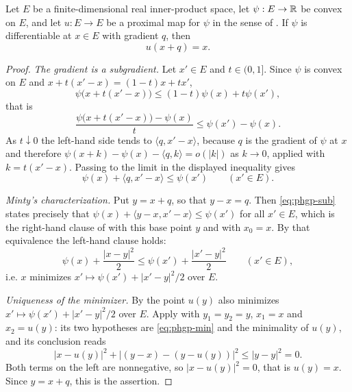 \begin{lemma}
Let $E$ be a finite-dimensional real inner-product space, let $\psi:E\to\mathbb{R}$ be
convex on $E$, and let $u:E\to E$ be a proximal map for $\psi$ in the sense of
. If $\psi$ is differentiable at $x\in E$ with gradient
$q$, then
\[
  u(x+q)=x .
\]
\end{lemma}
\begin{proof}
\emph{The gradient is a subgradient.}
Let $x'\in E$ and $t\in(0,1]$. Since $\psi$ is convex on $E$ and
$x+t(x'-x)=(1-t)x+tx'$,
\[
  \psi\bigl(x+t(x'-x)\bigr)\le(1-t)\psi(x)+t\psi(x'),
\]
that is
\[
  \frac{\psi\bigl(x+t(x'-x)\bigr)-\psi(x)}{t}\le\psi(x')-\psi(x).
\]
As $t\downarrow0$ the left-hand side tends to $\langle q,x'-x\rangle$, because
$q$ is the gradient of $\psi$ at $x$ and therefore
$\psi(x+k)-\psi(x)-\langle q,k\rangle=o(|k|)$ as $k\to0$, applied with
$k=t(x'-x)$. Passing to the limit in the displayed inequality gives
\begin{equation}\label{eq:phgp-sub}
  \psi(x)+\langle q,x'-x\rangle\le\psi(x')\qquad(x'\in E).
\end{equation}

\emph{Minty's characterization.}
Put $y=x+q$, so that $y-x=q$. Then \eqref{eq:phgp-sub} states precisely that
$\psi(x)+\langle y-x,x'-x\rangle\le\psi(x')$ for all $x'\in E$, which is the
right-hand clause of  with this base point $y$
and with $x_0=x$. By that equivalence the left-hand clause holds:
\begin{equation}\label{eq:phgp-min}
  \psi(x)+\frac{|x-y|^2}{2}\le\psi(x')+\frac{|x'-y|^2}{2}\qquad(x'\in E),
\end{equation}
i.e. $x$ minimizes $x'\mapsto\psi(x')+|x'-y|^2/2$ over $E$.

\emph{Uniqueness of the minimizer.}
By  the point $u(y)$ also minimizes
$x'\mapsto\psi(x')+|x'-y|^2/2$ over $E$. Apply
 with $y_1=y_2=y$, $x_1=x$ and $x_2=u(y)$: its two
hypotheses are \eqref{eq:phgp-min} and the minimality of $u(y)$, and its
conclusion reads
\[
  |x-u(y)|^2+\bigl|(y-x)-(y-u(y))\bigr|^2\le|y-y|^2=0 .
\]
Both terms on the left are nonnegative, so $|x-u(y)|^2=0$, that is $u(y)=x$.
Since $y=x+q$, this is the assertion.
\end{proof}

